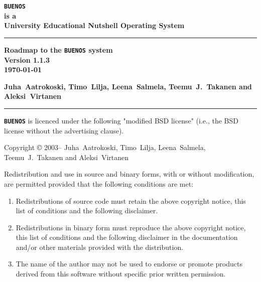 \documentclass[twoside,a4paper]{report}
\newcommand{\buenos}{\texttt{\textbf{BUENOS}}}
\newcommand{\authors}{%
Juha~Aatrokoski, Timo~Lilja, Leena~Salmela, %
Teemu~J.~Takanen and Aleksi~Virtanen%
}
\begin{document}
\pagestyle{plain}
\begin{titlepage}
{
\raggedright\bfseries\Huge
\texttt{BUENOS}\\
\large
\hspace{1em}is a\\
University Educational Nutshell Operating System\\
\rule{\textwidth}{2mm}
\raggedleft\bfseries\large
Roadmap to the \texttt{BUENOS} system\\
Version 1.1.3\\
\today\\
\raggedright\bfseries\large
\authors{}\\
\rule{\textwidth}{1mm}
}
\newpage
{}
\noindent

\noindent\buenos{} is licenced under the following "modified BSD
license" (i.e., the BSD license without the advertising clause).

\begin{flushleft}
\vspace{\baselineskip}
Copyright \copyright{} 2003--\number\year{} \authors{}
\vspace{\baselineskip}
\end{flushleft}

Redistribution and use in source and binary forms, with or without
modification, are permitted provided that the following conditions
are met:

\begin{enumerate}
\item Redistributions of source code must retain the above copyright
    notice, this list of conditions and the following disclaimer.
\item Redistributions in binary form must reproduce the above
    copyright notice, this list of conditions and the following
    disclaimer in the documentation and/or other materials provided
    with the distribution.
\item The name of the author may not be used to endorse or promote
    products derived from this software without specific prior
    written permission.
\end{enumerate}


\end{titlepage}
\end{document}
